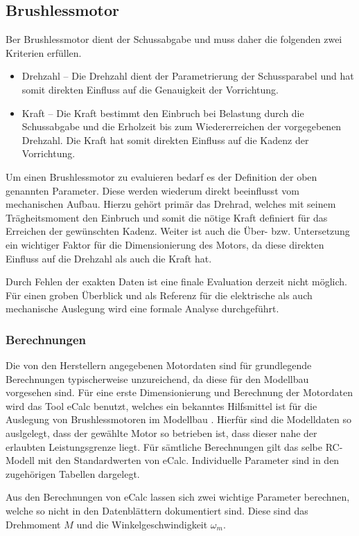 \subsection{Brushlessmotor}
Ber Brushlessmotor dient der Schussabgabe und muss daher die folgenden
zwei Kriterien erfüllen.

\begin{itemize}
	\item Drehzahl -- Die Drehzahl dient der Parametrierung der
		Schussparabel und hat somit direkten Einfluss auf die
		Genauigkeit der Vorrichtung.
	\item Kraft -- Die Kraft bestimmt den Einbruch bei Belastung durch
		die Schussabgabe und die Erholzeit bis zum Wiedererreichen
		der vorgegebenen Drehzahl. Die Kraft hat somit direkten
		Einfluss auf die Kadenz der Vorrichtung.
\end{itemize}

Um einen Brushlessmotor zu evaluieren bedarf es der Definition der oben
genannten Parameter. Diese werden wiederum direkt beeinflusst vom 
mechanischen Aufbau. Hierzu gehört primär das Drehrad, welches mit seinem
Trägheitsmoment den Einbruch und somit die nötige Kraft definiert für das
Erreichen der gewünschten Kadenz. Weiter ist auch die Über- bzw.
Untersetzung ein wichtiger Faktor für die Dimensionierung des Motors, da
diese direkten Einfluss auf die Drehzahl als auch die Kraft hat.

Durch Fehlen der exakten Daten ist eine finale Evaluation derzeit nicht
möglich. Für einen groben Überblick und als Referenz für die elektrische
als auch mechanische Auslegung wird eine formale Analyse durchgeführt.

\subsubsection{Berechnungen}
Die von den Herstellern angegebenen Motordaten sind für grundlegende
Berechnungen typischerweise unzureichend, da diese für den Modellbau
vorgesehen sind. Für eine erste Dimensionierung und Berechnung der
Motordaten wird das Tool eCalc benutzt, welches ein bekanntes
Hilfsmittel ist für die Auslegung von Brushlessmotoren im Modellbau
\cite{ecalc}. Hierfür sind die Modelldaten so auslgelegt, dass der
gewählte Motor so betrieben ist, dass dieser nahe der erlaubten
Leistungsgrenze liegt. Für sämtliche Berechnungen gilt das selbe
RC-Modell mit den Standardwerten von eCalc. Individuelle Parameter
sind in den zugehörigen Tabellen dargelegt.

Aus den Berechnungen von eCalc lassen sich zwei wichtige Parameter
berechnen, welche so nicht in den Datenblättern dokumentiert sind.
Diese sind das Drehmoment $M$ und die Winkelgeschwindigkeit $\omega_m$.

